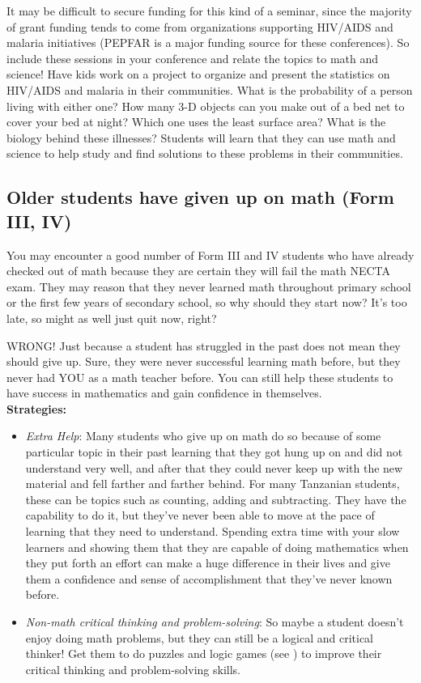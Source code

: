 \begin{itemize}
It may be difficult to secure funding for this kind of a seminar, since the majority of grant funding tends to come from organizations supporting HIV\slash AIDS and malaria initiatives (PEPFAR is a major funding source for these conferences). So include these sessions in your conference and relate the topics to math and science! Have kids work on a project to organize and present the statistics on HIV\slash AIDS and malaria in their communities. What is the probability of a person living with either one? How many 3-D objects can you make out of a bed net to cover your bed at night? Which one uses the least surface area? What is the biology behind these illnesses? Students will learn that they can use math and science to help study and find solutions to these problems in their communities.

\end{itemize}

\subsection{Older students have given up on math (Form III, IV)}
You may encounter a good number of Form III and IV students who have already checked out of math because they are certain they will fail the math NECTA exam. They may reason that they never learned math throughout primary school or the first few years of secondary school, so why should they start now? It's too late, so might as well just quit now, right?

WRONG! Just because a student has struggled in the past does not mean they should give up. Sure, they were never successful learning math before, but they never had YOU as a math teacher before. You can still help these students to have success in mathematics and gain confidence in themselves.\\

\textbf{Strategies:}
\begin{itemize}
\item\emph{Extra Help}: Many students who give up on math do so because of some particular topic in their past learning that they got hung up on and did not understand very well, and after that they could never keep up with the new material and fell farther and farther behind. For many Tanzanian students, these can be topics such as counting, adding and subtracting. They have the capability to do it, but they've never been able to move at the pace of learning that they need to understand. Spending extra time with your slow learners and showing them that they are capable of doing mathematics when they put forth an effort can make a huge difference in their lives and give them a confidence and sense of accomplishment that they've never known before.

\item\emph{Non-math critical thinking and problem-solving}: So maybe a student doesn't enjoy doing math problems, but they can still be a logical and critical thinker! Get them to do puzzles and logic games (see ) to improve their critical thinking and problem-solving skills.

\end{itemize}

